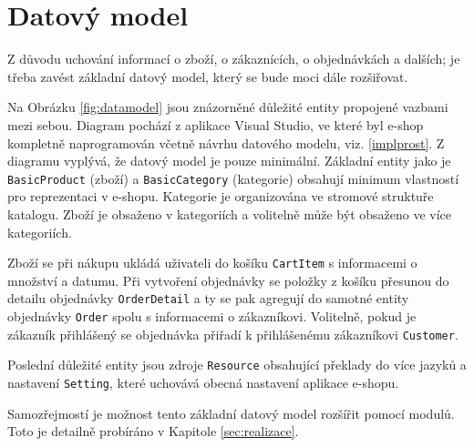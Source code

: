 \documentclass[11pt,twoside,a4paper]{book}
\begin{document}
\section{Datový model}

Z důvodu uchování informací o zboží, o zákaznících, o objednávkách a dalších; je třeba zavést základní datový model, který se bude moci dále rozšiřovat.

Na Obrázku \ref{fig:datamodel} jsou znázorněné důležité entity propojené vazbami mezi sebou. Diagram pochází z aplikace Visual Studio, ve které byl e-shop kompletně naprogramován včetně návrhu datového modelu, viz. \ref{implprost}. Z diagramu vyplývá, že datový model je pouze minimální. Základní entity jako je  \texttt{BasicProduct} (zboží) a \texttt{BasicCategory} (kategorie) obsahují minimum vlastností pro reprezentaci v e-shopu. Kategorie je organizována ve stromové struktuře katalogu. Zboží je obsaženo v kategoriích a volitelně může být obsaženo ve více kategoriích.
	
Zboží se při nákupu ukládá uživateli do košíku \texttt{CartItem} s informacemi o množství a datumu. Při vytvoření objednávky se položky z košíku přesunou do detailu objednávky \texttt{OrderDetail} a ty se pak agregují do samotné entity objednávky \texttt{Order} spolu s informacemi o zákazníkovi. Volitelně, pokud je zákazník přihlášený se objednávka přiřadí k přihlášenému zákazníkovi \texttt{Customer}. 
	
Poslední důležité entity jsou zdroje \texttt{Resource} obsahující překlady do více jazyků a nastavení \texttt{Setting}, které uchovává obecná nastavení aplikace e-shopu.

	Samozřejmostí je možnost tento základní datový model rozšířit pomocí modulů. Toto je detailně probíráno v Kapitole \ref{sec:realizace}.
	
\end{document}
